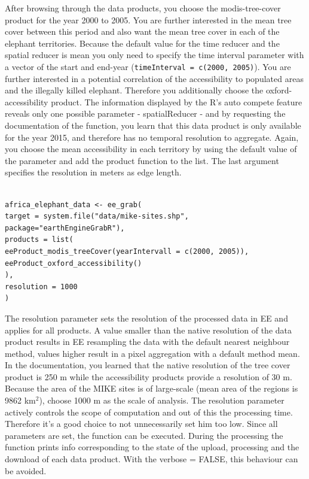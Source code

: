 After browsing through the data products, you choose the modis-tree-cover product for the year 2000 to 2005. You are further interested in the mean tree cover between this period and also want the mean tree cover in each of the elephant territories. Because the default value for the time reducer and the spatial reducer is mean you only need to specify the time interval parameter with a vector of the start and end-year (\texttt{timeInterval = c(2000, 2005)}). You are further interested in a potential correlation of the accessibility to populated areas and the illegally killed elephant. Therefore you additionally choose the oxford-accessibility product. The information displayed by the R's auto compete feature reveals only one possible parameter - spatialReducer - and by requesting the documentation of the function, you learn that this data product is only available for the year 2015, and therefore has no temporal resolution to aggregate. Again, you choose the mean accessibility in each territory by using the default value of the parameter and add the product function to the list. The last argument specifies the resolution in meters as edge length. 

\begin{lstlisting}

africa_elephant_data <- ee_grab(
target = system.file("data/mike-sites.shp", package="earthEngineGrabR"),
products = list(
eeProduct_modis_treeCover(yearIntervall = c(2000, 2005)),
eeProduct_oxford_accessibility()
),
resolution = 1000
)
\end{lstlisting}

The resolution parameter sets the resolution of the processed data in EE and applies for all products. A value smaller than the native resolution of the data product results in EE resampling the data with the default nearest neighbour method, values higher result in a pixel aggregation with a default method mean. In the documentation, you learned that the native resolution of the tree cover product is 250 m while the accessibility products provide a resolution of 30 m. Because the area of the MIKE sites is of large-scale (mean area of the regions is 9862 km$^2$), choose 1000 m as the scale of analysis. The resolution parameter actively controls the scope of computation and out of this the processing time. Therefore it's a good choice to not unnecessarily set him too low. 
Since all parameters are set, the function can be executed. 
During the processing the function prints info corresponding to the state of the upload, processing and the download of each data product. With the verbose = FALSE, this behaviour can be avoided. 

